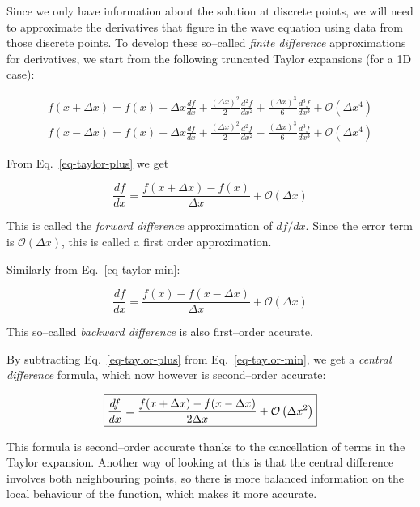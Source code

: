 Since we only have information about the solution at discrete points, we will need to approximate the derivatives that figure in the wave equation using data from those discrete points. To develop these so--called \emph{finite difference} approximations for derivatives, we start from the following truncated Taylor expansions (for a 1D case):

\begin{gather}
f(x+\Delta x) = f(x) + \Delta x \frac{d f}{d x} + \frac{{(\Delta x)}^2}{2} \frac{d^2 f}{d x^2} + \frac{{(\Delta x)}^3}{6} \frac{d^3 f}{d x^3} + \mathcal{O}\left(\Delta x^4\right) \label{eq-taylor-plus} \\
f(x-\Delta x) = f(x) - \Delta x \frac{d f}{d x} + \frac{{(\Delta x)}^2}{2} \frac{d^2 f}{d x^2} - \frac{{(\Delta x)}^3}{6} \frac{d^3 f}{d x^3} + \mathcal{O}\left(\Delta x^4\right) \label{eq-taylor-min}
\end{gather} 

From Eq.~\ref{eq-taylor-plus} we get

\begin{equation}
\frac{d f}{d x} = \frac{f(x+\Delta x) - f(x)}{\Delta x} + \mathcal{O}\left(\Delta x\right)
\end{equation} 

This is called the \emph{forward difference} approximation of $df / dx$. Since the error term is $\mathcal{O}(\Delta x)$, this is called a first order approximation.

Similarly from Eq.~\ref{eq-taylor-min}:

\begin{equation}
\frac{d f}{d x} = \frac{f(x) - f(x- \Delta x)}{\Delta x} + \mathcal{O}\left(\Delta x\right)
\end{equation} 

This so--called \emph{backward difference} is also first--order accurate.

By subtracting Eq.~\ref{eq-taylor-plus} from Eq.~\ref{eq-taylor-min}, we get a \emph{central difference} formula, which now however is second--order accurate:

\begin{equation}
\fbox{$\displaystyle
\frac{d f}{d x} = \frac{f(x + \Delta x) - f(x- \Delta x)}{2 \Delta x} + \mathcal{O}\left(\Delta x^2\right)
$}
\end{equation} 

This formula is second--order accurate thanks to the cancellation of terms in the Taylor expansion. Another way of looking at this is that the central difference involves both neighbouring points, so there is more balanced information on the local behaviour of the function, which makes it more accurate.

